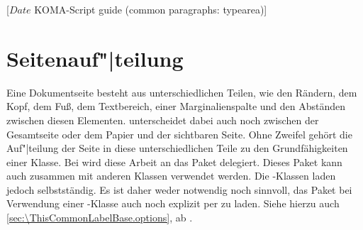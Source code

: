 %
%
%
%
%
%
%
%
% 
%
%
%
%

                 [$Date$
                  KOMA-Script guide (common paragraphs: typearea)]


\section{\texorpdfstring{Seitenauf"|teilung}{Seitenaufteilung}}
\BeginIndexGroup
{}

Eine Dokumentseite besteht aus unterschiedlichen Teilen, wie den Rändern, dem
Kopf, dem Fuß, dem Textbereich, einer Marginalienspalte und den Abständen
zwischen diesen Elementen. \KOMAScript{} unterscheidet dabei auch noch
zwischen der Gesamtseite oder dem Papier und der sichtbaren Seite. Ohne
Zweifel gehört die Auf"|teilung der Seite in diese unterschiedlichen Teile zu
den Grundfähigkeiten einer
Klasse. Bei \KOMAScript{}
wird diese Arbeit an das Paket  delegiert. Dieses Paket kann
auch zusammen mit anderen Klassen verwendet werden. Die \KOMAScript-Klassen
laden  jedoch selbstständig. Es ist daher weder notwendig
noch sinnvoll, das Paket bei Verwendung einer \KOMAScript-Klasse auch noch
explizit per  zu laden. Siehe hierzu auch
\autoref{sec:\ThisCommonLabelBase.options}, ab
.

